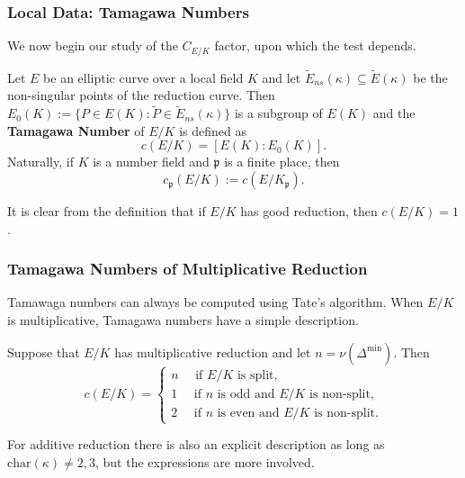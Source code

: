 \documentclass{beamer}
\newcommand{\pp}{\mathfrak{p}}
\theoremstyle{plain}
\begin{document}
\begin{frame}
    \frametitle{Local Data: Tamagawa Numbers}
    We now begin our study of the $C_{E/K}$ factor, upon which the test depends. 

    \begin{definition}
        Let $E$ be an elliptic curve over a local field $K$ and let $\tilde{E}_{ns}(\kappa)\subseteq \tilde{E}(\kappa)$ be the non-singular points of the reduction curve. Then $E_0(K):=\{P\in E(K):\tilde{P}\in \tilde{E}_{ns}(\kappa)\}$ is a subgroup of $E(K)$ and the \textbf{Tamagawa Number} of $E/K$ is defined as $$c(E/K)=[E(K):E_{0}(K)].$$
        Naturally, if $K$ is a number field and $\pp$ is a finite place, then
        $$c_\pp(E/K):=c(E/K_\pp).$$
    \end{definition}
    It is clear from the definition that if $E/K$ has good reduction, then $c(E/K)=1$.
\end{frame}

\begin{frame}
    \frametitle{Tamagawa Numbers of Multiplicative Reduction}
    Tamawaga numbers can always be computed using Tate's algorithm. When $E/K$ is multiplicative, Tamagawa numbers have a simple description.
    \begin{lemma}
        Suppose that $E/K$ has multiplicative reduction and let $n=\nu(\Delta^{\min})$. Then
        \[
        c(E/K)=
        \begin{cases}
            n\quad \text{ if $E/K$ is split,}\\
            1\quad \text{ if $n$ is odd and $E/K$ is non-split,}\\
            2\quad \text{ if $n$ is even and $E/K$ is non-split.}
        \end{cases}    
        \] 
    \end{lemma}

    For additive reduction there is also an explicit description as long as $\mathrm{char}(\kappa)\neq 2,3$, but the expressions are more involved.

\end{frame}
\end{document}

